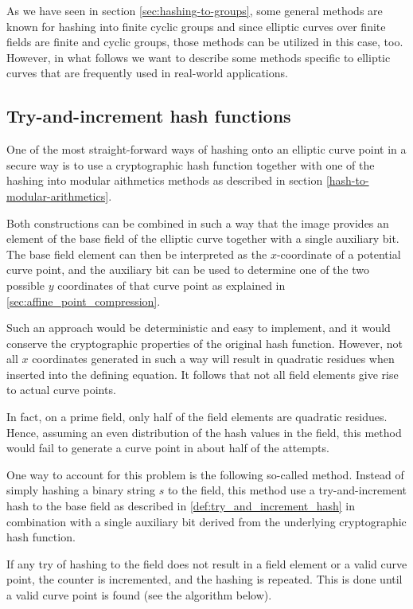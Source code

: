 As we have seen in section \ref{sec:hashing-to-groups}, some general methods are known for hashing into finite cyclic groups and since elliptic curves over finite fields are finite and cyclic groups, those methods can be utilized in this case, too. However, in what follows we want to describe some methods specific to elliptic curves that are frequently used in real-world applications. 

\subsection{Try-and-increment hash functions}
One of the most straight-forward ways of hashing onto an elliptic curve point in a secure way is to use a cryptographic hash function together with one of the hashing into modular aithmetics methods as described in section \ref{hash-to-modular-arithmetics}.

Both constructions can be combined in such a way that the image provides an element of the base field of the elliptic curve together with a single auxiliary bit. The base field element can then be interpreted as the $x$-coordinate of a potential curve point, and the auxiliary bit can be used to determine one of the two possible $y$ coordinates of that curve point as explained in \ref{sec:affine_point_compression}.

Such an approach would be deterministic and easy to implement, and it would conserve the cryptographic properties of the original hash function. However, not all $x$ coordinates generated in such a way will result in quadratic residues when inserted into the defining equation. It follows that not all field elements give rise to actual curve points. 

In fact,
on a prime field, only half of the field elements are quadratic residues. Hence, assuming an even distribution of the hash values in the field, this method would fail to generate a curve point in about half of the attempts. 

One way to account for this problem is the following so-called  method. Instead of simply hashing a binary string $s$ to the field, this method use a try-and-increment hash to the base field as described in \ref{def:try_and_increment_hash} in combination with a single auxiliary bit derived from the underlying cryptographic hash function.

If any try of hashing to the field does not result in a field element or a valid curve point, the counter is incremented, and the hashing is repeated. This is done until a valid curve point is found (see the algorithm below).

